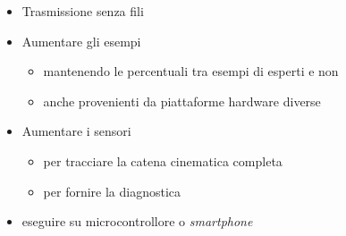 \begin{itemize}
	\item Trasmissione senza fili
    \item Aumentare gli esempi
    \begin{itemize}
		\item mantenendo le percentuali tra esempi di esperti e non
    	\item anche provenienti da piattaforme hardware diverse
	\end{itemize}
    \item Aumentare i sensori
    \begin{itemize}
		\item per tracciare la catena cinematica completa
    	\item per fornire la diagnostica
	\end{itemize}
    \item eseguire su microcontrollore o \textit{smartphone}
\end{itemize}
